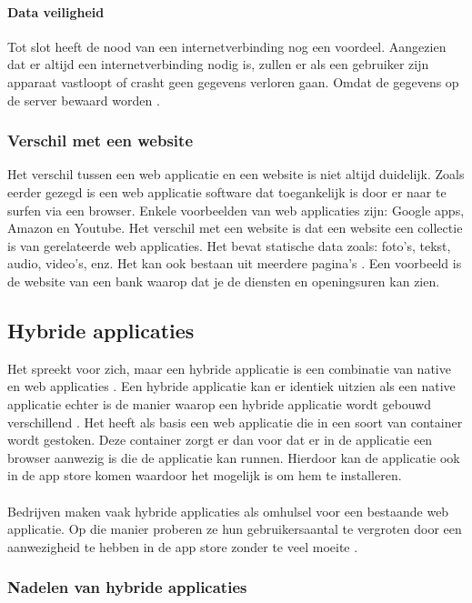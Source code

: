 \paragraph{Data veiligheid}
Tot slot heeft de nood van een internetverbinding nog een voordeel. Aangezien dat er altijd een 
internetverbinding nodig is, zullen er als een gebruiker zijn apparaat vastloopt of crasht geen gegevens 
verloren gaan. Omdat de gegevens op de server bewaard worden \autocite{Nehra2023}. 

\subsubsection{Verschil met een website}
Het verschil tussen een web applicatie en een website is niet altijd duidelijk. Zoals eerder gezegd 
is een web applicatie software dat toegankelijk is door er naar te surfen via een browser. 
Enkele voorbeelden van web applicaties zijn: Google apps, Amazon en Youtube. Het verschil met 
een website is dat een website een collectie is van gerelateerde web applicaties. Het bevat statische 
data zoals: foto's, tekst, audio, video's, enz. Het kan ook bestaan uit meerdere pagina's 
\autocite{sugandha2022}. Een voorbeeld is de website van een bank waarop dat je de diensten en 
openingsuren kan zien.

\subsection{Hybride applicaties}
Het spreekt voor zich, maar een hybride applicatie is een combinatie van native en web 
applicaties \autocite{Denko2021}. Een hybride applicatie kan er identiek uitzien als een 
native applicatie echter is de manier waarop een hybride applicatie wordt gebouwd 
verschillend \autocite{Beeproger2023}. Het heeft als basis een web applicatie die in 
een soort van container wordt gestoken. Deze container zorgt er dan voor dat er in de 
applicatie een browser aanwezig is die de applicatie kan runnen. Hierdoor kan de applicatie 
ook in de app store komen waardoor het mogelijk is om hem te installeren. 
\\\\
Bedrijven maken vaak hybride applicaties als omhulsel voor een bestaande web applicatie. 
Op die manier proberen ze hun gebruikersaantal te vergroten door een aanwezigheid te hebben 
in de app store zonder te veel moeite \autocite{Budiu2016}. 

\subsubsection{Nadelen van hybride applicaties}

